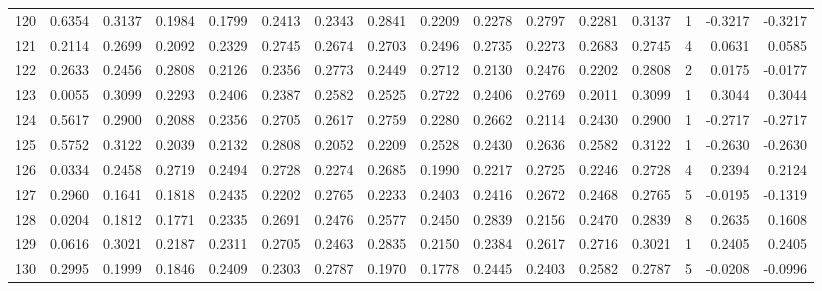 \begin{tabular}{lrrrrrrrrrrrrrrr}
120 &      0.6354 &  0.3137 &  0.1984 &  0.1799 &  0.2413 &  0.2343 &  0.2841 &  0.2209 &  0.2278 &  0.2797 &   0.2281 &     0.3137 &      1 &                   -0.3217 &                    -0.3217 \\
121 &      0.2114 &  0.2699 &  0.2092 &  0.2329 &  0.2745 &  0.2674 &  0.2703 &  0.2496 &  0.2735 &  0.2273 &   0.2683 &     0.2745 &      4 &                    0.0631 &                     0.0585 \\
122 &      0.2633 &  0.2456 &  0.2808 &  0.2126 &  0.2356 &  0.2773 &  0.2449 &  0.2712 &  0.2130 &  0.2476 &   0.2202 &     0.2808 &      2 &                    0.0175 &                    -0.0177 \\
123 &      0.0055 &  0.3099 &  0.2293 &  0.2406 &  0.2387 &  0.2582 &  0.2525 &  0.2722 &  0.2406 &  0.2769 &   0.2011 &     0.3099 &      1 &                    0.3044 &                     0.3044 \\
124 &      0.5617 &  0.2900 &  0.2088 &  0.2356 &  0.2705 &  0.2617 &  0.2759 &  0.2280 &  0.2662 &  0.2114 &   0.2430 &     0.2900 &      1 &                   -0.2717 &                    -0.2717 \\
125 &      0.5752 &  0.3122 &  0.2039 &  0.2132 &  0.2808 &  0.2052 &  0.2209 &  0.2528 &  0.2430 &  0.2636 &   0.2582 &     0.3122 &      1 &                   -0.2630 &                    -0.2630 \\
126 &      0.0334 &  0.2458 &  0.2719 &  0.2494 &  0.2728 &  0.2274 &  0.2685 &  0.1990 &  0.2217 &  0.2725 &   0.2246 &     0.2728 &      4 &                    0.2394 &                     0.2124 \\
127 &      0.2960 &  0.1641 &  0.1818 &  0.2435 &  0.2202 &  0.2765 &  0.2233 &  0.2403 &  0.2416 &  0.2672 &   0.2468 &     0.2765 &      5 &                   -0.0195 &                    -0.1319 \\
128 &      0.0204 &  0.1812 &  0.1771 &  0.2335 &  0.2691 &  0.2476 &  0.2577 &  0.2450 &  0.2839 &  0.2156 &   0.2470 &     0.2839 &      8 &                    0.2635 &                     0.1608 \\
129 &      0.0616 &  0.3021 &  0.2187 &  0.2311 &  0.2705 &  0.2463 &  0.2835 &  0.2150 &  0.2384 &  0.2617 &   0.2716 &     0.3021 &      1 &                    0.2405 &                     0.2405 \\
130 &      0.2995 &  0.1999 &  0.1846 &  0.2409 &  0.2303 &  0.2787 &  0.1970 &  0.1778 &  0.2445 &  0.2403 &   0.2582 &     0.2787 &      5 &                   -0.0208 &                    -0.0996 \\

\end{tabular}
